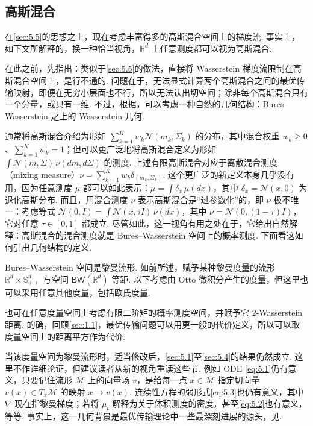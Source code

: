 \subsection{高斯混合}\label{sec:5.6}

在\autoref{sec:5.5}的思想之上，现在考虑丰富得多的高斯混合空间上的梯度流. 事实上，如下文所解释的，换一种恰当视角，$\mathbb R^d$ 上任意测度都可以视为高斯混合.

在此之前，先指出：类似于\autoref{sec:5.5}的做法，直接将 Wasserstein 梯度流限制在高斯混合空间上，是行不通的. 问题在于，无法显式计算两个高斯混合之间的最优传输映射，即便在无穷小层面也不行，所以无法认出切空间；除非每个高斯混合只有一个分量，或只有一维. 不过，根据\cite{ref69,ref107}，可以考虑一种自然的几何结构：Bures--Wasserstein 之上的 Wasserstein 几何.

通常将高斯混合介绍为形如 $\sum_{k=1}^Kw_k\mathcal N(m_k,\Sigma_k)$ 的分布，其中混合权重 $w_k\geq0$、$\sum_{k=1}^Kw_k=1$；但可以更广泛地将高斯混合定义为形如 $\int\mathcal N(m,\Sigma)\,\nu(dm,d\Sigma)$ 的测度. 上述有限高斯混合对应于离散混合测度（mixing measure）$\nu=\sum_{k=1}^Kw_k\delta_{(m_k,\Sigma_k)}$. 这个更广泛的新定义本身几乎没有用，因为任意测度 $\mu$ 都可以如此表示：$\mu=\int\delta_x\,\mu(dx)$，其中 $\delta_x=\mathcal N(x,0)$ 为退化高斯分布. 而且，用混合测度 $\nu$ 表示高斯混合是“过参数化”的，即 $\nu$ 极不唯一：考虑等式 $\mathcal N(0,I)=\int\mathcal N(x,\tau I)\,\nu(dx)$，其中 $\nu=\mathcal N(0,(1-\tau)I)$，它对任意 $\tau\in[0,1]$ 都成立. 尽管如此，这一视角有用之处在于，它给出自然解释：高斯混合的混合测度就是 Bures--Wasserstein 空间上的概率测度. 下面看这如何引出几何结构的定义.

Bures--Wasserstein 空间是黎曼流形. 如前所述，赋予某种黎曼度量的流形 $\mathbb R^d\times\mathbb S_{++}^d$ 与空间 $\mathsf{BW}(\mathbb R^d)$ 等距. 以下考虑由 Otto 微积分产生的度量，但这里也可以采用任意其他度量，包括欧氏度量.

也可在任意度量空间上考虑有限二阶矩的概率测度空间，并赋予它 $2$-Wasserstein 距离. 的确，回顾\autoref{sec:1.1}，最优传输问题可以用更一般的代价定义，所以可以取度量空间上的距离平方作为代价.

当该度量空间为黎曼流形时，适当修改后，\autoref{sec:5.1}至\autoref{sec:5.4}的结果仍然成立. 这里不作详细论证，但建议读者从新的视角重读这些节. 例如 ODE \eqref{eq:5.1}仍有意义，只要记住流形 $\mathcal M$ 上的向量场 $v$，是给每一点 $x\in\mathcal M$ 指定切向量 $v(x)\in T_x\mathcal M$ 的映射 $x\mapsto v(x)$. 连续性方程的弱形式\eqref{eq:5.3}也仍有意义，其中 $\nabla$ 现在指黎曼梯度；若将 $\mu_t$ 解释为关于体积测度的密度，甚至\eqref{eq:5.2}也有意义，等等. 事实上，这一几何背景是最优传输理论中一些最深刻进展的源头，见\cite{ref317}.

